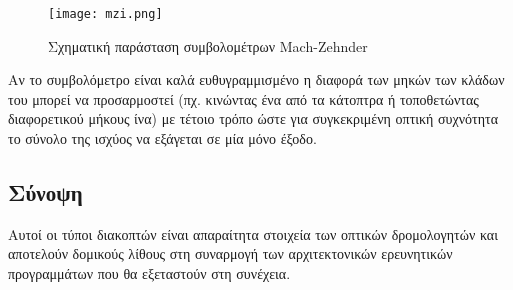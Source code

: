 \begin{figure}[h]
  \centering
  \texttt{[image: mzi.png]}
  \caption{Σχηματική παράσταση συμβολομέτρων Mach-Zehnder}
  \label{fig:mzi}
\end{figure}

Αν το συμβολόμετρο είναι καλά ευθυγραμμισμένο η διαφορά των μηκών των
κλάδων του μπορεί να προσαρμοστεί (πχ. κινώντας ένα από τα κάτοπτρα ή
τοποθετώντας διαφορετικού μήκους ίνα) με τέτοιο τρόπο ώστε για
συγκεκριμένη οπτική συχνότητα το σύνολο της ισχύος να εξάγεται σε μία
μόνο έξοδο.

\subsection{Σύνοψη}

Αυτοί οι τύποι διακοπτών είναι
απαραίτητα στοιχεία των οπτικών δρομολογητών και αποτελούν δομικούς 
λίθους στη συναρμογή των αρχιτεκτονικών ερευνητικών προγραμμάτων
που θα εξεταστούν στη συνέχεια.


